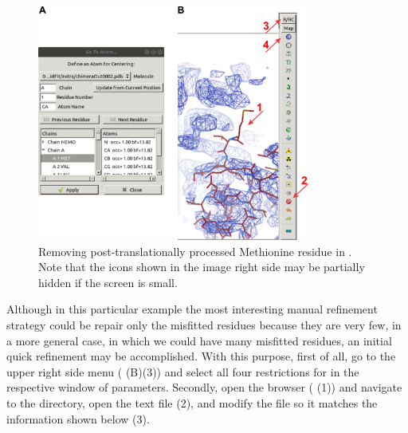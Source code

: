   \begin{figure}[H]
  \centering 
  \captionsetup{width=.9\linewidth} 
  \includegraphics[width=0.80\textwidth]{Images/Fig27}
  \caption{Removing post-translationally processed Methionine residue in \coot. Note that the icons shown in the image right side may be partially hidden if the screen is small.}
  \label{fig:coot_go_to_atom}
  \end{figure}
  
  Although in this particular example the most interesting manual refinement strategy could be repair only the misfitted residues because they are very few, in a more general case, in which we could have many misfitted residues, an initial quick refinement may be accomplished. With this purpose, first of all, go to the upper right side menu ( (B)(3)) and select all four restrictions for  in the respective window of parameters. Secondly, open the \scipion browser ( (1)) and navigate to the  directory, open the  text file (2), and modify the file so it matches the information shown below (3).\\
  \ttt{[myvars]}\\
  \\
  \\
  \\
  \\
  \\
  
